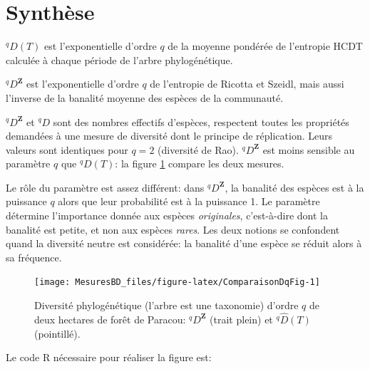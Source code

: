\documentclass[
  11pt,
  french,
  a4paper,
  extrafontsizes,onecolumn,openright
  ]{memoir}
\begin{document}
\hypertarget{sec:dqzSynthese}{%
\section{Synthèse}\label{sec:dqzSynthese}}

\(^{q}\!D(T)\) est l'exponentielle d'ordre \(q\) de la moyenne pondérée de l'entropie HCDT calculée à chaque période de l'arbre phylogénétique.

\(^q\!D^{\mathbf{Z}}\) est l'exponentielle d'ordre \(q\) de l'entropie de Ricotta et Szeidl, mais aussi l'inverse de la banalité moyenne des espèces de la communauté.

\(^q\!D^{\mathbf{Z}}\) et \(^{q}\!D\) sont des nombres effectifs d'espèces, respectent toutes les propriétés demandées à une mesure de diversité dont le principe de réplication.
Leurs valeurs sont identiques pour \(q=2\) (diversité de Rao).
\(^q\!D^{\mathbf{Z}}\) est moins sensible au paramètre \(q\) que \(^{q}\!D(T)\): la figure \ref{fig:ComparaisonDqFig} compare les deux mesures.

Le rôle du paramètre est assez différent: dans \(^q\!D^{\mathbf{Z}}\), la banalité des espèces est à la puissance \(q\) alors que leur probabilité est à la puissance 1.
Le paramètre détermine l'importance donnée aux espèces \emph{originales}, c'est-à-dire dont la banalité est petite, et non aux espèces \emph{rares}.
Les deux notions se confondent quand la diversité neutre est considérée: la banalité d'une espèce se réduit alors à sa fréquence.



\scriptsize

\begin{figure}

{\centering \texttt{[image: MesuresBD\_files/figure-latex/ComparaisonDqFig-1]} 

}

\caption{Diversité phylogénétique (l'arbre est une taxonomie) d'ordre \(q\) de deux hectares de forêt de Paracou: \(^q\!D^{\mathbf{Z}}\) (trait plein) et \(^{q}\!\hat{D}(T)\) (pointillé).}\label{fig:ComparaisonDqFig}
\end{figure}

\normalsize

Le code R nécessaire pour réaliser la figure est:

\scriptsize
\end{document}
